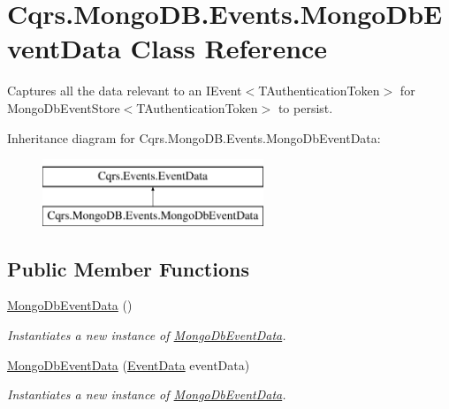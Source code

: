 \hypertarget{classCqrs_1_1MongoDB_1_1Events_1_1MongoDbEventData}{}\section{Cqrs.\+Mongo\+D\+B.\+Events.\+Mongo\+Db\+Event\+Data Class Reference}
\label{classCqrs_1_1MongoDB_1_1Events_1_1MongoDbEventData}


Captures all the data relevant to an I\+Event$<$\+T\+Authentication\+Token$>$ for Mongo\+Db\+Event\+Store$<$\+T\+Authentication\+Token$>$ to persist.  


Inheritance diagram for Cqrs.\+Mongo\+D\+B.\+Events.\+Mongo\+Db\+Event\+Data\+:\begin{figure}[H]
\begin{center}
\leavevmode
\includegraphics[height=2.000000cm]{classCqrs_1_1MongoDB_1_1Events_1_1MongoDbEventData}
\end{center}
\end{figure}
\subsection*{Public Member Functions}
\begin{DoxyCompactItemize}
\item 
\hyperlink{classCqrs_1_1MongoDB_1_1Events_1_1MongoDbEventData_a3e0d14163cbc3e11505d63b15ddd1337_a3e0d14163cbc3e11505d63b15ddd1337}{Mongo\+Db\+Event\+Data} ()
\begin{DoxyCompactList}\small\item\em Instantiates a new instance of \hyperlink{classCqrs_1_1MongoDB_1_1Events_1_1MongoDbEventData}{Mongo\+Db\+Event\+Data}. \end{DoxyCompactList}\item 
\hyperlink{classCqrs_1_1MongoDB_1_1Events_1_1MongoDbEventData_acdd39bdfc67a9becd0734f4bf056b74b_acdd39bdfc67a9becd0734f4bf056b74b}{Mongo\+Db\+Event\+Data} (\hyperlink{classCqrs_1_1Events_1_1EventData}{Event\+Data} event\+Data)
\begin{DoxyCompactList}\small\item\em Instantiates a new instance of \hyperlink{classCqrs_1_1MongoDB_1_1Events_1_1MongoDbEventData}{Mongo\+Db\+Event\+Data}. \end{DoxyCompactList}\end{DoxyCompactItemize}
